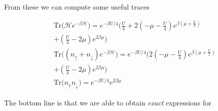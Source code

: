 From these we can compute some useful traces

\begin{equation}
\begin{split}
&\text{Tr} \bigg( \mathcal{H} e^{-\beta\mathcal{H} } \bigg) = e^{-\beta U / 4} \bigg(\frac{U}{4} + 2 (-\mu - \frac{U}{4})  e^{\beta(\mu + \frac{U}{2})} \\
& + (\frac{U}{4} - 2\mu ) e^{2\beta \mu} \bigg) \\
&\text{Tr} \bigg( (n_\uparrow + n_\downarrow ) e^{-\beta\mathcal{H} } \bigg) = e^{-\beta U / 4} \bigg(2 (-\mu - \frac{U}{4})  e^{\beta(\mu + \frac{U}{2})} \\
& + (\frac{U}{4} - 2\mu ) e^{2\beta \mu} \bigg) \\
&\text{Tr} \bigg( n_\uparrow n_\downarrow \bigg) = e^{-\beta U/4} e^{2\beta\mu}
\end{split}
\end{equation}

The bottom line is that we are able to obtain \emph{exact} expressions for

